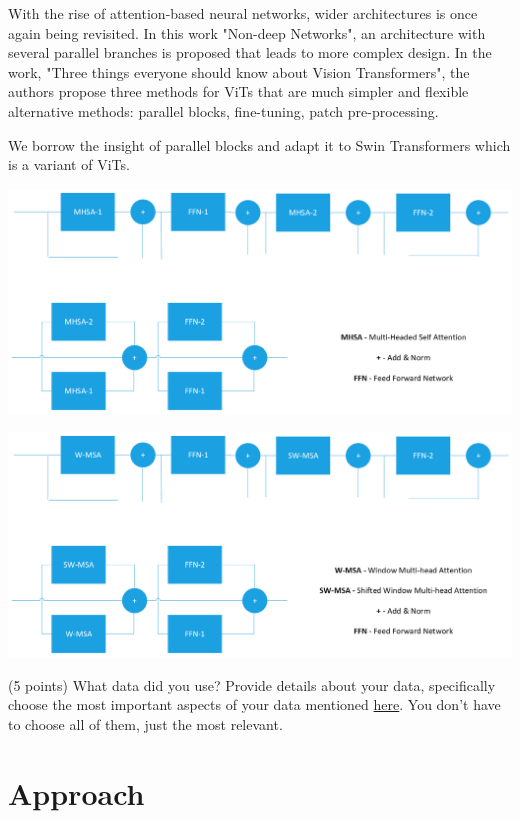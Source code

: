 \documentclass[10pt,twocolumn,letterpaper]{article}
\begin{document}
With the rise of attention-based neural networks, wider architectures is once again being revisited\cite{goyal2021non}. In this work "Non-deep Networks", an architecture with several parallel branches is proposed that leads to more complex design. In the work, "Three things everyone should know about Vision Transformers", the authors propose three methods for ViTs that are much simpler and flexible alternative methods: parallel blocks, fine-tuning, patch pre-processing\cite{touvron2022three}. 

We borrow the insight of parallel blocks and adapt it to Swin Transformers\cite{liu2021swin} which is a variant of ViTs.

\includegraphics[width=0.8\linewidth]{docs/latex/images/MHSA-Original.png}
\caption{}

\includegraphics[width=0.8\linewidth]{docs/latex/images/MSA-Swin.png}
\caption{}



(5 points) What data did you use? Provide details about your data, specifically choose the most important aspects of your data mentioned \href{https://arxiv.org/abs/1803.09010}{here}. You don’t have to choose all of them, just the most relevant.


\section{Approach}
\end{document}
